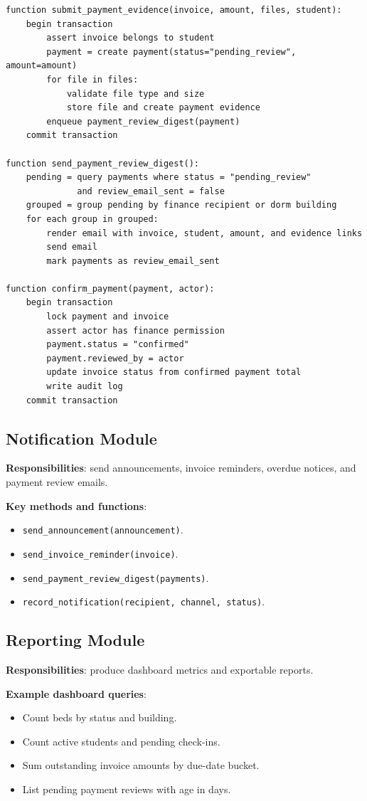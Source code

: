 \documentclass[11pt,a4paper]{article}
\begin{document}
\begin{verbatim}
function submit_payment_evidence(invoice, amount, files, student):
    begin transaction
        assert invoice belongs to student
        payment = create payment(status="pending_review", amount=amount)
        for file in files:
            validate file type and size
            store file and create payment evidence
        enqueue payment_review_digest(payment)
    commit transaction

function send_payment_review_digest():
    pending = query payments where status = "pending_review"
              and review_email_sent = false
    grouped = group pending by finance recipient or dorm building
    for each group in grouped:
        render email with invoice, student, amount, and evidence links
        send email
        mark payments as review_email_sent

function confirm_payment(payment, actor):
    begin transaction
        lock payment and invoice
        assert actor has finance permission
        payment.status = "confirmed"
        payment.reviewed_by = actor
        update invoice status from confirmed payment total
        write audit log
    commit transaction
\end{verbatim}

\subsection{Notification Module}
\textbf{Responsibilities}: send announcements, invoice reminders, overdue notices, and payment review emails.

\textbf{Key methods and functions}:
\begin{itemize}
  \item \texttt{send\_announcement(announcement)}.
  \item \texttt{send\_invoice\_reminder(invoice)}.
  \item \texttt{send\_payment\_review\_digest(payments)}.
  \item \texttt{record\_notification(recipient, channel, status)}.
\end{itemize}

\subsection{Reporting Module}
\textbf{Responsibilities}: produce dashboard metrics and exportable reports.

\textbf{Example dashboard queries}:
\begin{itemize}
  \item Count beds by status and building.
  \item Count active students and pending check-ins.
  \item Sum outstanding invoice amounts by due-date bucket.
  \item List pending payment reviews with age in days.
\end{itemize}
\end{document}
